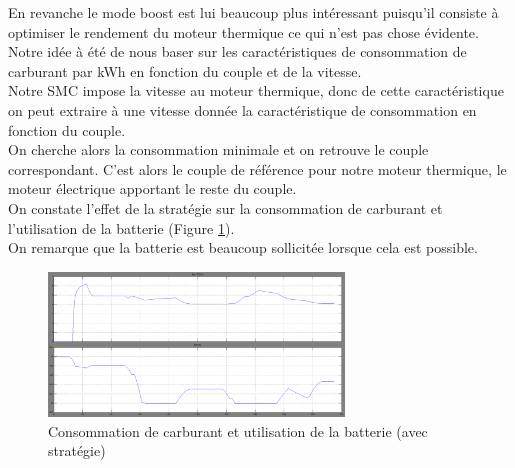 En revanche le mode boost est lui beaucoup plus intéressant puisqu'il consiste à optimiser le rendement du moteur thermique ce qui n'est pas chose évidente.\\
Notre idée à été de nous baser sur les caractéristiques de consommation de carburant par kWh en fonction du couple et de la vitesse.\\
Notre SMC impose la vitesse au moteur thermique, donc de cette caractéristique on peut extraire à une vitesse donnée la caractéristique de consommation en fonction du couple.\\
On cherche alors la consommation minimale et on retrouve le couple correspondant. C'est alors le couple de référence pour notre moteur thermique, le moteur électrique apportant le reste du couple.\\

On constate l'effet de la stratégie sur la consommation de carburant et l'utilisation de la batterie (Figure \ref{img:liter_optimisation}).\\ On remarque que la batterie est beaucoup sollicitée lorsque cela est possible.\\

\begin{figure}[ht]
\begin{center}
	\includegraphics[width=0.7\textwidth]{images/liter_optimisation}
	\caption{Consommation de carburant et utilisation de la batterie (avec stratégie)}\label{img:liter_optimisation}
\end{center}
\end{figure}
\FloatBarrier